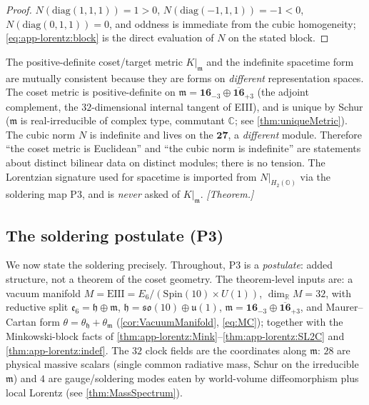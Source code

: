 \begin{proof}
$N(\mathrm{diag}(1,1,1))=1>0$, $N(\mathrm{diag}(-1,1,1))=-1<0$,
$N(\mathrm{diag}(0,1,1))=0$, and oddness is immediate from the cubic homogeneity;
\eqref{eq:app-lorentz:block} is the direct evaluation of $N$ on the stated block.
\end{proof}

\begin{theorem}
\label{thm:app-lorentz:consistency}
The positive-definite coset/target metric $K|_{\mathfrak{m}}$ and the indefinite
spacetime form are mutually consistent because they are forms on \emph{different}
representation spaces. The coset metric is positive-definite on
$\mathfrak{m}=\mathbf{16}_{-3}\oplus\overline{\mathbf{16}}_{+3}$ (the adjoint
complement, the $32$-dimensional internal tangent of EIII), and is unique by Schur
($\mathfrak{m}$ is real-irreducible of complex type, commutant $\mathbb{C}$; see
\autoref{thm:uniqueMetric}). The cubic norm $N$ is indefinite and lives on the
$\mathbf{27}$, a \emph{different} module. Therefore ``the coset metric is Euclidean''
and ``the cubic norm is indefinite'' are statements about distinct bilinear data on
distinct modules; there is no tension. The Lorentzian signature used for spacetime is
imported from $N|_{H_{2}(\mathbb{O})}$ via the soldering map P3, and is \emph{never}
asked of $K|_{\mathfrak{m}}$. \emph{[Theorem.]}
\end{theorem}

\subsection{The soldering postulate (P3)}
\label{subsec:app-lorentz:p3}

We now state the soldering precisely. Throughout, P3 is a \emph{postulate}: added
structure, not a theorem of the coset geometry. The theorem-level inputs are: a
vacuum manifold $M=\mathrm{EIII}=E_{6}/(\mathrm{Spin}(10)\times U(1))$, $\dim_{\mathbb{R}}M=32$,
with reductive split $\mathfrak{e}_{6}=\mathfrak{h}\oplus\mathfrak{m}$,
$\mathfrak{h}=\mathfrak{so}(10)\oplus\mathfrak{u}(1)$,
$\mathfrak{m}=\mathbf{16}_{-3}\oplus\overline{\mathbf{16}}_{+3}$, and Maurer--Cartan
form $\theta=\theta_{\mathfrak{h}}+\theta_{\mathfrak{m}}$
(\autoref{cor:VacuumManifold}, \autoref{eq:MC}); together with the Minkowski-block
facts of \autoref{thm:app-lorentz:Mink}--\autoref{thm:app-lorentz:SL2C} and
\autoref{thm:app-lorentz:indef}. The $32$ clock fields are the coordinates along
$\mathfrak{m}$: $28$ are physical massive scalars (single common radiative mass,
Schur on the irreducible $\mathfrak{m}$) and $4$ are gauge/soldering modes eaten by
world-volume diffeomorphism plus local Lorentz (see \autoref{thm:MassSpectrum}).

